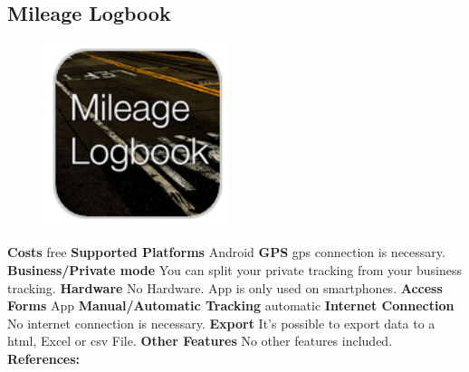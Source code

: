 \begin{singlespace}
\section{Mileage Logbook}
\begin{figure}
  \begin{center}
    \includegraphics[width=0.48\textwidth]{bilder/mileage}
  \end{center}
\end{figure}
\textbf{Costs} free
\newline\newline
\textbf{Supported Platforms} Android 
\newline\newline
\textbf{GPS} \gls{gps} connection is necessary.
\newline\newline
\textbf{Business/Private mode} You can split your private tracking from your business tracking.
\newline\newline
\textbf{Hardware} No Hardware. App is only used on smartphones.
\newline\newline
\textbf{Access Forms} App
\newline\newline
\textbf{Manual/Automatic Tracking} automatic
\newline\newline
\textbf{Internet Connection} No internet connection is necessary.
\newline\newline
\textbf{Export} It’s possible to export data to a \gls{html}, Excel or \gls{csv} File.
\newline\newline
\textbf{Other Features} No other features included.
\newline\newline
\textbf{References:} \cite{Mileage_Logbook}
\newpage
\clearpageauthor

\end{singlespace}

